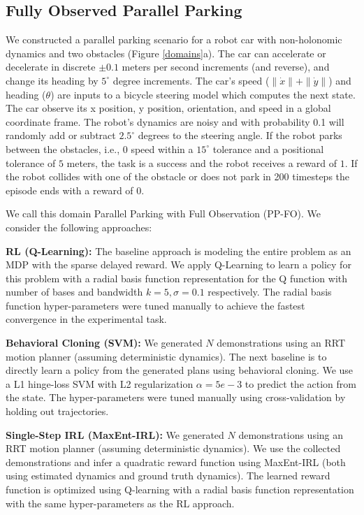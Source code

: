 \subsection{Fully Observed Parallel Parking}\label{exp:pp}
We constructed a parallel parking scenario for a robot car with non-holonomic dynamics and two obstacles (Figure \ref{domains}a). 
The car can accelerate or decelerate in discrete $\pm 0.1$ meters per second increments (and reverse), and change its heading by $5^\circ$ degree increments.
The car's speed ($\|\dot{x}\|+\|\dot{y}\|$) and heading ($\theta$) are inputs to a bicycle steering model which computes the next state.
The car observe its x position, y position, orientation, and speed in a global coordinate frame.
The robot's dynamics are noisy and with probability 0.1 will randomly add or subtract $2.5^\circ$ degrees to the steering angle.
If the robot parks between the obstacles, i.e., 0 speed within a $15^\circ$ tolerance and a positional tolerance of $5$ meters, the task is a success and the robot receives a reward of $1$. 
If the robot collides with one of the obstacle or does not park in 200 timesteps the episode ends with a reward of $0$.

We call this domain Parallel Parking with Full Observation (PP-FO). We consider the following approaches:

\vspace{0.25em}\noindent \textbf{RL (Q-Learning): } The baseline approach is modeling the entire problem as an MDP with the sparse delayed reward. We apply Q-Learning to learn a policy for this problem with a radial basis function representation for the Q function with number of bases and bandwidth $k=5, \sigma=0.1$ respectively. The radial basis function hyper-parameters were tuned manually to achieve the fastest convergence in the experimental task. 

\vspace{0.25em}\noindent \textbf{Behavioral Cloning (SVM): } We generated $N$ demonstrations using an RRT motion planner (assuming deterministic dynamics). The next baseline is to directly learn a policy from the generated plans using behavioral cloning. We use a L1 hinge-loss SVM with L2 regularization $\alpha=5e-3$ to predict the action from the state. The hyper-parameters were tuned manually using cross-validation by holding out trajectories.

\vspace{0.25em}\noindent \textbf{Single-Step IRL (MaxEnt-IRL): } We generated $N$ demonstrations using an RRT motion planner (assuming deterministic dynamics). We use the collected demonstrations and infer a quadratic reward function using MaxEnt-IRL (both using estimated dynamics and ground truth dynamics). The learned reward function is optimized using Q-learning with a radial basis function representation with the same hyper-parameters as the RL approach. 

